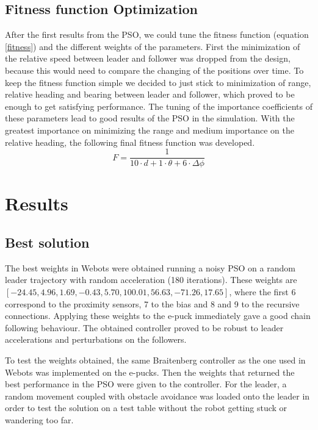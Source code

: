 \documentclass[a4paper, 10pt, conference]{ieeeconf}      %
\begin{document}
\subsection{Fitness function Optimization}
After the first results from the PSO, we could tune the fitness function (equation \ref{fitness}) and the different weights of the parameters. First the minimization of the relative speed between leader and follower was dropped from the design, because this would need to compare the changing of the positions over time. To keep the fitness function simple we decided to just stick to minimization of range, relative heading and bearing between leader and follower, which proved to be enough to get satisfying performance. The tuning of the importance coefficients of these parameters  lead to good results of the PSO in the simulation. With the greatest importance on minimizing the range and medium importance on the relative heading, the following final fitness function was developed.
\begin{equation}\label{fitness2}
F=\frac{1}{10 \cdot d+1 \cdot \theta+6 \cdot \Delta \phi}
\end{equation}


\section{Results}
\subsection{Best solution} The best weights in Webots were obtained running a noisy PSO on a random leader trajectory with random acceleration (180 iterations). These weights are $[-24.45, 4.96, 1.69, -0.43, 5.70, 100.01, 56.63, -71.26, 17.65]$, where the first 6 correspond to the proximity sensors, 7 to the bias and 8 and 9 to the recursive connections. Applying these weights to the e-puck immediately gave a good chain following behaviour. The obtained controller proved to be robust to leader accelerations and perturbations on the followers.

To test the weights obtained, the same Braitenberg controller as the one used in Webots was implemented on the e-pucks. Then the weights that returned the best performance in the PSO were given to the controller. For the leader, a random movement coupled with obstacle avoidance was loaded onto the leader in order to test the solution on a test table without the robot getting stuck or wandering too far.
\end{document}
